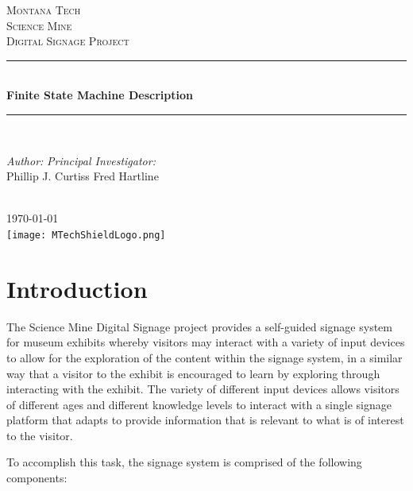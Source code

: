 \documentclass[10pt]{article}
\newcommand{\HRule}{\rule{\linewidth}{0.5mm}}
\begin{document}
\thispagestyle{firststyle}
\pagestyle{fancy}

\begin{titlepage}
 \begin{center}
 	\textsc{\LARGE Montana Tech}\\[1.5cm]
	\textsc{\Large Science Mine}\\[0.5cm]
	\textsc{\large Digital Signage Project}\\[0.5cm]
	
	\HRule \\[0.4cm]
	{\huge \bfseries Finite State Machine Description} \\[0.4cm]
	\HRule \\[1.5cm]
	
	\begin{minipage}{0.8\textwidth} 
		\large
		\emph{Author:} \hfill \emph{Principal Investigator:} \\
		Phillip J. Curtiss \hfill Fred Hartline
	\end{minipage} \\[2cm]
	
	{\large \today} \\[2cm]
	
	\texttt{[image: MTechShieldLogo.png]}
 \end{center}
\end{titlepage}

\section{Introduction}

The Science Mine Digital Signage project provides a self-guided signage system for museum exhibits whereby visitors may interact with a variety of input devices to allow for the exploration of the content within the signage system, in a similar way that a visitor to the exhibit is encouraged to learn by exploring through interacting with the exhibit. The variety of different input devices allows visitors of different ages and different knowledge levels to interact with a single signage platform that adapts to provide information that is relevant to what is of interest to the visitor. 

To accomplish this task, the signage system is comprised of the following components: 
\end{document}
